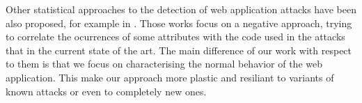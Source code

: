 \documentclass[runningheads,a4paper]{llncs}
\newcommand{\commentatside}[1]{\pdfcomment[color={0.045 0.278 0.643},icon=Note]{#1}}
\newcommand{\todo}[1]{\commentatside{#1}}
\begin{document}
\todo{Vigna et all}

Other statistical approaches to the detection of web application attacks have been also proposed, for example in \cite{Gallagher}. Those works focus on a negative approach, trying to correlate the ocurrences of some attributes with the code used in the attacks that in the current state of the art. The main difference of our work with respect to them is that we focus on characterising the normal behavior of the web application. This make our approach more plastic and resiliant to variants of known attacks or even to completely new ones. 







\end{document}
